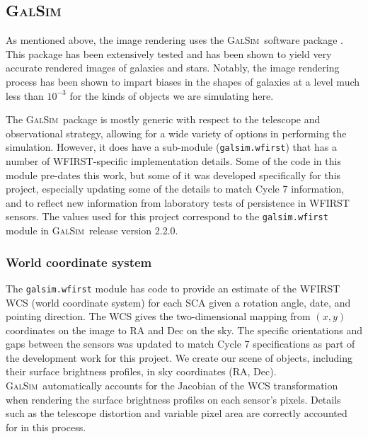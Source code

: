 \documentclass[aps,prd, amsmath,amssymb,superscriptaddress,showkeys,nofootinbib,reprint,preprintnumbers]{revtex4-1}
\newcommand{\galsim}{\textsc{GalSim}}
\begin{document}
\subsection{\galsim}

As mentioned above, the image rendering uses the \galsim\ software package \cite{Rowe15}.  
This package has been extensively tested and has been shown to yield very accurate rendered images of galaxies and stars.
Notably, the image rendering process has been shown to impart biases in the shapes of galaxies at a level much less than $10^{-3}$ for the kinds of objects we are simulating here.  

The \galsim\ package is mostly generic with respect to the telescope and observational strategy, allowing for a wide variety of options in performing the simulation.
However, it does have a sub-module (\texttt{galsim.wfirst}) that has a number of WFIRST-specific implementation details.
Some of the code in this module pre-dates this work, but some of it was developed specifically for this project, especially updating some of the details to match Cycle 7 information, and to reflect new information from laboratory tests of persistence in WFIRST sensors.  
The values used for this project correspond to the \texttt{galsim.wfirst} module in \galsim\ release version 2.2.0.

\subsubsection{World coordinate system}\label{wcs}

The \texttt{galsim.wfirst} module has code to provide an estimate of the WFIRST WCS (world coordinate system) for each SCA given a rotation angle, date, and pointing direction.  
The WCS gives the two-dimensional mapping from $(x,y)$ coordinates on the image to RA and Dec on the sky.
The specific orientations and gaps between the sensors was updated to match Cycle 7 specifications as part of the development work for this project.
We create our scene of objects, including their surface brightness profiles, in sky coordinates (RA, Dec).
\galsim\ automatically accounts for the Jacobian of the WCS transformation when rendering the surface brightness profiles on each sensor's pixels.  
Details such as the telescope distortion and variable pixel area are correctly accounted for in this process.
\end{document}
